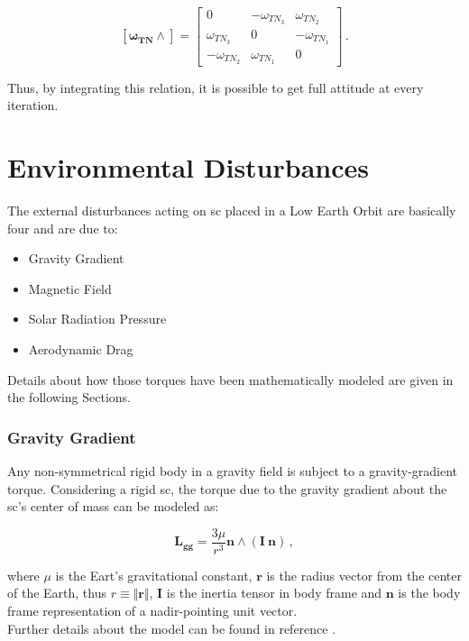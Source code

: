 \begin{equation*}
  \mathbf{[\omega_{TN} \wedge]} =
  \begin{bmatrix}
    0                & -\omega_{TN_{3}} & \omega_{TN_{2}}  \\
    \omega_{TN_{3}}  & 0                & -\omega_{TN_{1}} \\
    -\omega_{TN_{2}} & \omega_{TN_{1}}  & 0
  \end{bmatrix} \,.
\end{equation*}

Thus, by integrating this relation, it is possible to get full attitude at every iteration.

\section{Environmental Disturbances} \label{sec:disturbances}
The external disturbances acting on \acrshort{sc} placed in a Low Earth Orbit are basically four and are due to:

\begin{itemize}
  \item Gravity Gradient
  \item Magnetic Field
  \item Solar Radiation Pressure
  \item Aerodynamic Drag
\end{itemize}

Details about how those torques have been mathematically modeled are given in the following Sections.

\subsubsection{Gravity Gradient}
Any non-symmetrical rigid body in a gravity field is subject to a gravity-gradient torque.
Considering a rigid \acrshort{sc}, the torque due to the gravity gradient about the \acrshort{sc}'s center of mass can be modeled as:

\begin{equation}
  \mathbf{L_{gg}} = \frac{3 \mu}{r^3} \mathbf{n} \wedge (\mathbf{I} \ \mathbf{n}) \,,
\end{equation}

where $\mu$ is the Eart's gravitational constant, $\textbf{r}$ is the radius vector from the center of the Earth, thus $r \equiv \Vert{\textbf{r}}\Vert$, $\textbf{I}$ is the inertia tensor in body frame and $\textbf{n}$ is the body frame representation of a nadir-pointing unit vector.\\
Further details about the model can be found in reference \cite{Markley2014}.

